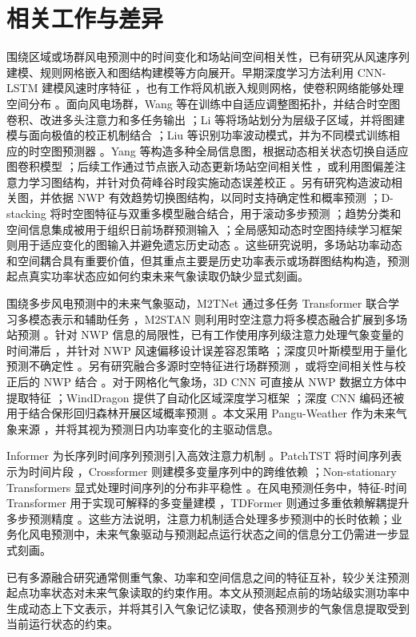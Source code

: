 \section{相关工作与差异}

围绕区域或场群风电预测中的时间变化和场站间空间相关性，已有研究从风速序列建模、规则网格嵌入和图结构建模等方向展开。早期深度学习方法利用 CNN-LSTM 建模风速时序特征 \cite{ref1}，也有工作将风机嵌入规则网格，使卷积网络能够处理空间分布 \cite{ref2}。面向风电场群，Wang 等在训练中自适应调整图拓扑，并结合时空图卷积、改进多头注意力和多任务输出 \cite{ref3}；Li 等将场站划分为层级子区域，并将图建模与面向极值的校正机制结合 \cite{ref4}；Liu 等识别功率波动模式，并为不同模式训练相应的时空图预测器 \cite{ref5}。Yang 等构造多种全局信息图，根据动态相关状态切换自适应图卷积模型 \cite{ref6}；后续工作通过节点嵌入动态更新场站空间相关性 \cite{ref7}，或利用图偏差注意力学习图结构，并针对负荷峰谷时段实施动态误差校正 \cite{ref8}。另有研究构造波动相关图，并依据 NWP 有效趋势切换图结构，以同时支持确定性和概率预测 \cite{ref9}；D-stacking 将时空图特征与双重多模型融合结合，用于滚动多步预测 \cite{ref10}；趋势分类和空间信息集成被用于组织日前场群预测输入 \cite{ref11}；全局感知动态时空图持续学习框架则用于适应变化的图输入并避免遗忘历史动态 \cite{ref12}。这些研究说明，多场站功率动态和空间耦合具有重要价值，但其重点主要是历史功率表示或场群图结构构造，预测起点真实功率状态应如何约束未来气象读取仍缺少显式刻画。

围绕多步风电预测中的未来气象驱动，M2TNet 通过多任务 Transformer 联合学习多模态表示和辅助任务 \cite{ref13}，M2STAN 则利用时空注意力将多模态融合扩展到多场站预测 \cite{ref14}。针对 NWP 信息的局限性，已有工作使用序列级注意力处理气象变量的时间滞后 \cite{ref15}，并针对 NWP 风速偏移设计误差容忍策略 \cite{ref16}；深度贝叶斯模型用于量化预测不确定性 \cite{ref_liu_bayesian_uncertainty}。另有研究融合多源时空特征进行场群预测 \cite{ref17}，或将空间相关性与校正后的 NWP 结合 \cite{ref18}。对于网格化气象场，3D CNN 可直接从 NWP 数据立方体中提取特征 \cite{ref19}；WindDragon 提供了自动化区域深度学习框架 \cite{ref20}；深度 CNN 编码还被用于结合保形回归森林开展区域概率预测 \cite{ref21}。本文采用 Pangu-Weather 作为未来气象来源 \cite{ref22}，并将其视为预测日内功率变化的主驱动信息。

Informer 为长序列时间序列预测引入高效注意力机制 \cite{ref23}。PatchTST 将时间序列表示为时间片段 \cite{ref24}，Crossformer 则建模多变量序列中的跨维依赖 \cite{ref25}；Non-stationary Transformers 显式处理时间序列的分布非平稳性 \cite{ref26}。在风电预测任务中，特征-时间 Transformer 用于实现可解释的多变量建模 \cite{ref_liu_feature_temporal}，TDFormer 则通过多重依赖解耦提升多步预测精度 \cite{ref_liu_tdformer}。这些方法说明，注意力机制适合处理多步预测中的长时依赖；业务化风电预测中，未来气象驱动与预测起点运行状态之间的信息分工仍需进一步显式刻画。

已有多源融合研究通常侧重气象、功率和空间信息之间的特征互补，较少关注预测起点功率状态对未来气象读取的约束作用。本文从预测起点前的场站级实测功率中生成动态上下文表示，并将其引入气象记忆读取，使各预测步的气象信息提取受到当前运行状态的约束。
